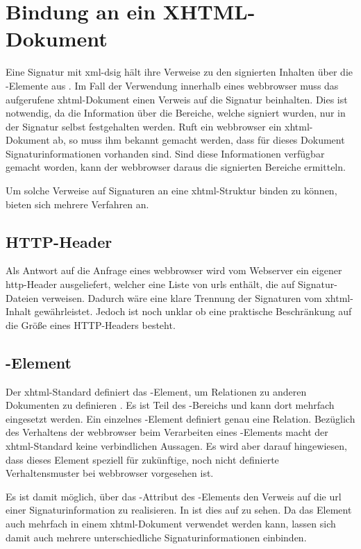 \chapter{Bindung an ein XHTML-Dokument}
\label{chap:Signaturbindung}
Eine Signatur mit \gls{xml-dsig} hält ihre Verweise zu den signierten Inhalten über die -Elemente aus .
Im Fall der Verwendung innerhalb eines \gls{webbrowser} muss das aufgerufene \gls{xhtml}-Dokument einen Verweis auf die Signatur beinhalten. Dies ist notwendig,
da die Information über die Bereiche, welche signiert wurden, nur in der Signatur selbst festgehalten werden. Ruft ein \gls{webbrowser} ein \gls{xhtml}-Dokument
ab, so muss ihm bekannt gemacht werden, dass für dieses Dokument Signaturinformationen vorhanden sind. Sind diese Informationen verfügbar gemacht worden, kann
der \gls{webbrowser} daraus die signierten Bereiche ermitteln.

Um solche Verweise auf Signaturen an eine \gls{xhtml}-Struktur binden zu können, bieten sich mehrere Verfahren an.

\section{HTTP-Header}
Als Antwort auf die Anfrage eines \gls{webbrowser} wird vom Webserver ein eigener \gls{http}-Header ausgeliefert, welcher eine Liste von \glspl{url} enthält, die auf
Signatur-Dateien verweisen. Dadurch wäre eine klare Trennung der Signaturen vom \gls{xhtml}-Inhalt gewährleistet.
Jedoch ist noch unklar ob eine praktische Beschränkung auf die Größe eines HTTP-Headers besteht.\todo

\section{-Element}
Der \gls{xhtml}-Standard definiert das -Element, um Relationen zu anderen Dokumenten zu definieren \cite{xhtml:oreilly}. Es ist Teil des
-Bereichs und kann dort mehrfach eingesetzt werden. Ein einzelnes -Element definiert genau eine Relation. Bezüglich des Verhaltens
der \gls{webbrowser} beim Verarbeiten eines -Elements macht der \gls{xhtml}-Standard keine verbindlichen Aussagen. Es wird aber darauf
hingewiesen, dass dieses Element speziell für zukünftige, noch nicht definierte Verhaltensmuster bei \gls{webbrowser} vorgesehen ist.

Es ist damit möglich, über das -Attribut des -Elements den Verweis auf die \gls{url} einer Signaturinformation zu realisieren. In
 ist dies auf  zu sehen. Da das
Element auch mehrfach in einem \gls{xhtml}-Dokument verwendet werden kann, lassen sich damit auch mehrere unterschiedliche Signaturinformationen einbinden.

